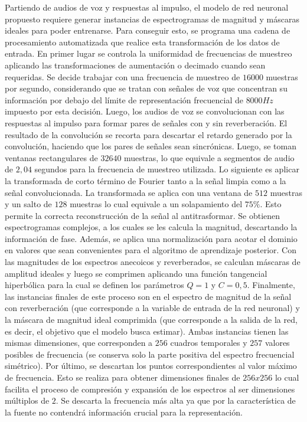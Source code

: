 Partiendo de audios de voz y respuestas al impulso, el modelo de red neuronal propuesto requiere generar instancias de espectrogramas de magnitud y máscaras ideales para poder entrenarse. Para conseguir esto, se programa una cadena de procesamiento automatizada que realice esta transformación de los datos de entrada. 
En primer lugar se controla la uniformidad de frecuencias de muestreo aplicando las transformaciones de aumentación o decimado cuando sean requeridas. Se decide trabajar con una frecuencia de muestreo de $16000$ muestras por segundo, considerando que se tratan con señales de voz que concentran su información por debajo del límite de representación frecuencial de $8000 Hz$ impuesto por esta decisión. 
Luego, los audios de voz se convolucionan con las respuestas al impulso para formar pares de señales con y sin reverberación. El resultado de la convolución se recorta para descartar el retardo generado por la convolución, haciendo que los pares de señales sean sincrónicas. Luego, se toman ventanas rectangulares de $32640$ muestras, lo que equivale a segmentos de audio de $2,04$ segundos para la frecuencia de muestreo utilizada. Lo siguiente es aplicar la transformada de corto término de Fourier tanto a la señal limpia como a la señal convolucionada. La transformada se aplica con una ventana de $512$ muestras y un salto de $128$ muestras lo cual equivale a un solapamiento del $75\%$. Esto permite la correcta reconstrucción de la señal al antitrasformar. Se obtienen espectrogramas complejos, a los cuales se les calcula la magnitud, descartando la información de fase. Además, se aplica una normalización para acotar el dominio en valores que sean convenientes para el algoritmo de  aprendizaje posterior. Con las magnitudes de los espectros anecoicos y reverberados, se calculan máscaras de amplitud ideales y luego se comprimen aplicando una función tangencial hiperbólica para la cual se definen los parámetros $Q=1$ y $C=0,5$. Finalmente, las instancias finales de este proceso son en el espectro de magnitud de la señal con reverberación (que corresponde a la variable de entrada de la red neuronal) y la máscara de magnitud ideal comprimida (que corresponde a la salida de la red, es decir, el objetivo que el modelo busca estimar). Ambas instancias tienen las mismas dimensiones, que corresponden a $256$ cuadros temporales y $257$ valores posibles de frecuencia (se conserva solo la parte positiva del espectro frecuencial simétrico). Por último, se descartan los puntos correspondientes al valor máximo de frecuencia. Esto se realiza para obtener dimensiones finales de $256x256$ lo cual facilita el proceso de compresión y expansión de los espectros al ser dimensiones múltiplos de $2$. Se descarta la frecuencia más alta ya que por la característica de la fuente  no contendrá información crucial para la representación.  

